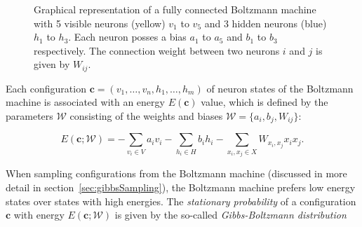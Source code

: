 \begin{figure}[H]
    \centering
    \caption[Fully Connected Boltzmann Machine]{Graphical representation of a fully connected Boltzmann machine with 5 visible neurons (yellow) $v_1$ to $v_5$
    and 3 hidden neurons (blue) $h_1$ to $h_3$. Each neuron posses a bias
    $a_1$ to $a_5$ and $b_1$ to $b_3$ respectively. The connection weight between two neurons $i$ and $j$
    is given by $W_{ij}$.}
    \label{fig:boltzmannMachine}
\end{figure}

Each configuration $\bm{c}=(v_1,\dots,v_n,h_1,\dots,h_m)$ of neuron states
of the Boltzmann machine is associated with an energy $E(\bm{c})$ value,
which is defined by the parameters $\mathcal{W}$ consisting of the weights and 
biases $\mathcal{W} = \{a_i, b_j, W_{ij}\}$:

\begin{equation}
  E(\bm{c};\mathcal{W}) = - \sum_{v_i \in V} a_{i}v_{i} - \sum_{h_i \in H} b_{i}h_{i} - \sum_{x_i,x_j \in X} W_{x_i,x_j}x_{i}x_{j}.
\end{equation}

When sampling configurations from the Boltzmann machine (discussed in more detail in section~\ref{sec:gibbsSampling}), the 
Boltzmann machine prefers low energy states over states with high energies. The \textit{stationary probability}
of a configuration $\bm{c}$ with energy $E(\bm{c};\mathcal{W})$ is given by the so-called \textit{Gibbs-Boltzmann distribution} \cite{gibbs_2010}

